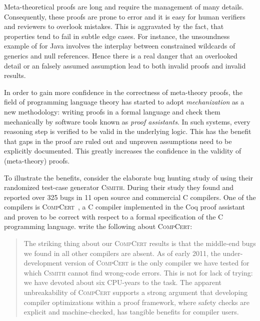 {Meta-theoretical proofs are long and require the management of many
details. Consequently, these proofs are prone to error and it is easy for human
verifiers and reviewers to overlook mistakes. This is aggravated by the fact,
that properties tend to fail in subtle edge cases. For instance, the unsoundness
example of \cite{amin2016java} for Java involves the interplay between
constrained wildcards of generics and null references. Hence there is a real
danger that an overlooked detail or an falsely assumed assumption lead to both
invalid proofs and invalid results.

In order to gain more confidence in the correctness of meta-theory proofs, the
field of programming language theory has started to adopt \emph{mechanization}
as a new methodology: writing proofs in a formal language and check them
mechanically by software tools known as \emph{proof assistants}.  In such
systems, every reasoning step is verified to be valid in the underlying
logic. This has the benefit that gaps in the proof are ruled out and unproven
assumptions need to be explicitly documented. This greatly increases the
confidence in the validity of (meta-theory) proofs.

To illustrate the benefits, consider the elaborate bug hunting study of
\cite{yang2011bugs} using their randomized test-case generator \textsc{Csmith}.
During their study they found and reported over 325 bugs in 11 open source and
commercial C compilers. One of the compilers is
\textsc{CompCert}~\cite{Leroy2009}, a C compiler implemented in the Coq proof
assistant and proven to be correct with respect to a formal specification of the
C programming language. \cite{yang2011bugs} write the following about
\textsc{CompCert}:


\blockquote{The striking thing about our \textsc{CompCert} results is that the
  middle-end bugs we found in all other compilers are absent. As of early 2011,
  the under-development version of \textsc{CompCert} is the only compiler we
  have tested for which \textsc{Csmith} cannot find wrong-code errors. This is
  not for lack of trying: we have devoted about six CPU-years to the task. The
  apparent unbreakability of \textsc{CompCert} supports a strong argument that
  developing compiler optimizations within a proof framework, where safety
  checks are explicit and machine-checked, has tangible benefits for compiler
  users.}

}
